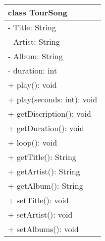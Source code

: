 \documentclass{scrartcl}
\begin{document}
\begin{tabular}{|p{}|}
\hline
	class TourSong\\
\hline
	- Title: String\\
	- Artist: String\\
	- Album: String\\
	- duration: int\\
\hline
	+ play(): void\\
	+ play(seconds: int): void\\
	+ getDiscription(): void\\
	+ getDuration(): void\\
	+ loop(): void\\
	+ getTitle(): String\\
	+ getArtist(): String\\
	+ getAlbum(): String\\
	+ setTitle(): void\\
	+ setArtist(): void\\
	+ setAlbums(): void\\
\hline
\end{tabular}
\end{document}
